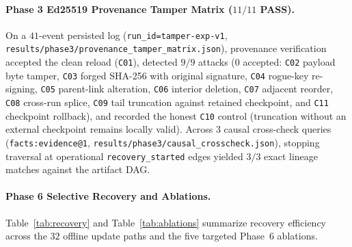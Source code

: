 \documentclass[11pt,a4paper]{article}
\begin{document}
\paragraph{Phase 3 Ed25519 Provenance Tamper Matrix ($11/11$ PASS).}
On a $41$-event persisted log (\texttt{run\_id=tamper-exp-v1}, \texttt{results/phase3/provenance\_tamper\_matrix.json}), provenance verification accepted the clean reload (\texttt{C01}), detected $9/9$ attacks ($0$ accepted: \texttt{C02} payload byte tamper, \texttt{C03} forged SHA-256 with original signature, \texttt{C04} rogue-key re-signing, \texttt{C05} parent-link alteration, \texttt{C06} interior deletion, \texttt{C07} adjacent reorder, \texttt{C08} cross-run splice, \texttt{C09} tail truncation against retained checkpoint, and \texttt{C11} checkpoint rollback), and recorded the honest \texttt{C10} control (truncation without an external checkpoint remains locally valid). Across $3$ causal cross-check queries (\texttt{facts:evidence@1}, \texttt{results/phase3/causal\_crosscheck.json}), stopping traversal at operational \texttt{recovery\_started} edges yielded $3/3$ exact lineage matches against the artifact DAG.

\paragraph{Phase 6 Selective Recovery and Ablations.}
Table~\ref{tab:recovery} and Table~\ref{tab:ablations} summarize recovery efficiency across the $32$ offline update paths and the five targeted Phase~6 ablations.
\end{document}
